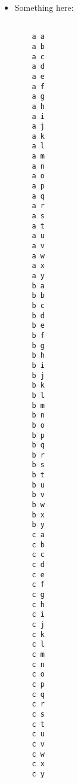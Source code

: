 \documentclass[
a4paper,
]{article}
\begin{document}
	
\begin{itemize}
\item Something here:

	\begin{Verbatim}[commandchars=\\\{\}, mathescape]
	
	a a
	a b
	a c
	a d
	a e
	a f
	a g
	a h
	a i
	a j
	a k
	a l
	a m
	a n
	a o
	a p
	a q
	a r
	a s
	a t
	a u
	a v
	a w
	a x
	a y
	b a
	b b
	b c
	b d
	b e
	b f
	b g
	b h
	b i
	b j
	b k
	b l
	b m
	b n
	b o
	b p
	b q
	b r
	b s
	b t
	b u
	b v
	b w
	b x
	b y
	c a
	c b
	c c
	c d
	c e
	c f
	c g
	c h
	c i
	c j
	c k
	c l
	c m
	c n
	c o
	c p
	c q
	c r
	c s
	c t
	c u
	c v
	c w
	c x
	c y
	
	\end{Verbatim}

\end{itemize}
\end{document}
